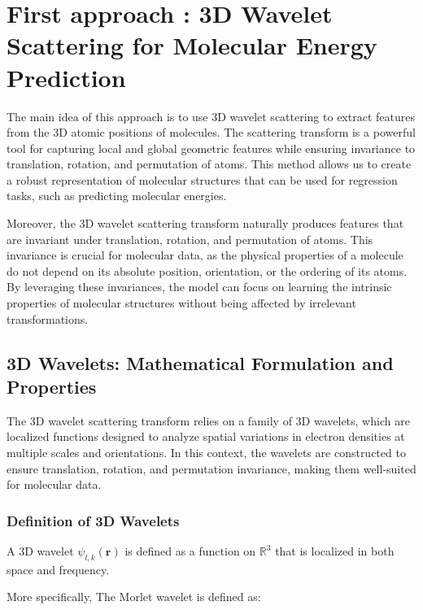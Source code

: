 \documentclass{article}
\begin{document}
\section{First approach : 3D Wavelet Scattering for Molecular Energy Prediction}

The main idea of this approach is to use 3D wavelet scattering to extract features from the 3D atomic positions of molecules. The scattering transform is a powerful tool for capturing local and global geometric features while ensuring invariance to translation, rotation, and permutation of atoms. This method allows us to create a robust representation of molecular structures that can be used for regression tasks, such as predicting molecular energies. \newline

Moreover, the 3D wavelet scattering transform naturally produces features that are invariant under translation, rotation, and permutation of atoms. This invariance is crucial for molecular data, as the physical properties of a molecule do not depend on its absolute position, orientation, or the ordering of its atoms. By leveraging these invariances, the model can focus on learning the intrinsic properties of molecular structures without being affected by irrelevant transformations. \newline


\subsection{3D Wavelets: Mathematical Formulation and Properties}

The 3D wavelet scattering transform relies on a family of 3D wavelets, which are localized functions designed to analyze spatial variations in electron densities at multiple scales and orientations. In this context, the wavelets are constructed to ensure translation, rotation, and permutation invariance, making them well-suited for molecular data.

\subsubsection{Definition of 3D Wavelets}

A 3D wavelet $\psi_{l,k}(\mathbf{r})$ is defined as a function on $\mathbb{R}^3$ that is localized in both space and frequency.  \newline

More specifically, The Morlet wavelet is defined as:
\end{document}
